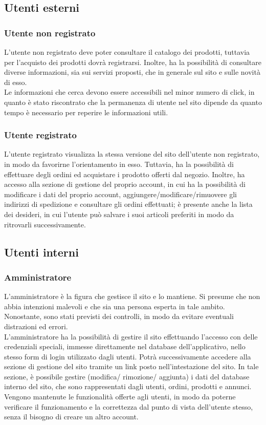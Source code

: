 	\subsection{Utenti esterni}
		\subsubsection{Utente non registrato}
		L'utente non registrato deve poter consultare il catalogo dei prodotti, tuttavia per l'acquisto dei prodotti dovrà registrarsi. Inoltre, ha la possibilità di consultare diverse informazioni, sia sui servizi proposti, che in generale sul sito e sulle novità di esso.  \\
		Le informazioni che cerca devono essere accessibili nel minor numero di click, in quanto è stato riscontrato che la permanenza di utente nel sito dipende da quanto tempo è necessario per reperire le informazioni utili.
		
		\subsubsection{Utente registrato}
		L'utente registrato visualizza la stessa versione del sito dell'utente non registrato, in modo da favorirne l'orientamento in esso. Tuttavia, ha la possibilità di effettuare degli ordini ed acquistare i prodotto offerti dal negozio. Inoltre, ha accesso alla sezione di gestione del proprio account, in cui ha la possibilità di modificare i dati del proprio account, aggiungere/modificare/rimuovere gli indirizzi di spedizione e consultare gli ordini effettuati; è presente anche la lista dei desideri, in cui l'utente può salvare i suoi articoli preferiti in modo da ritrovarli successivamente.

	\subsection{Utenti interni}
		\subsubsection{Amministratore}
		L'amministratore è la figura che gestisce il sito e lo mantiene. Si presume che non abbia intenzioni malevoli e che sia una persona esperta in tale ambito. Nonostante, sono stati previsti dei controlli, in modo da evitare eventuali distrazioni ed errori. \\
		L'amministratore ha la possibilità di gestire il sito effettuando l'accesso con delle credenziali speciali, immesse direttamente nel database dell'applicativo, nello stesso form di login utilizzato dagli utenti. Potrà successivamente accedere alla sezione di gestione del sito tramite un link posto nell'intestazione del sito. In tale sezione, è possibile gestire (modifica/ rimozione/ aggiunta) i dati del database interno del sito, che sono rappresentati dagli utenti, ordini, prodotti e annunci. \\
		Vengono mantenute le funzionalità offerte agli utenti, in modo da poterne verificare il funzionamento e la correttezza dal punto di vista dell'utente stesso, senza il bisogno di creare un altro account.

